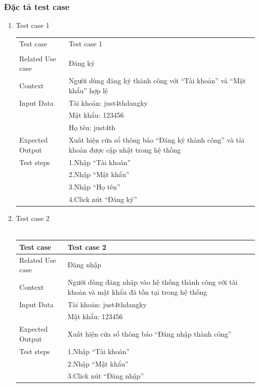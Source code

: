 \documentclass[a4paper, 12pt]{article}
\begin{document}
\subsubsection{Đặc tả test case}
	\begin{enumerate}
		\item Test case 1\\
		\begin{tabular}{|l|l|}
			\hline
			Test case&
			Test case 1\\\\
			\hline
			Related Use case&
			Đăng ký\\
			\hline
			Context&
			Người dùng đăng ký thành công với “Tài khoản” và “Mật khẩu” hợp lệ\\
			\hline
			Input Data&
			Tài khoản: just4thdangky\\&
			Mật khẩu: 123456\\&
			Họ tên: just4th\\
			\hline
			Expected Output&
			Xuất hiện cửa sổ thông báo “Đăng ký thành công” và tài khoản được cập nhật trong hệ thống\\
			\hline
			Test steps&
			1.Nhập “Tài khoản”\\&
			2.Nhập “Mật khẩu”\\&
			3.Nhập “Họ tên”\\&
			4.Click nút “Đăng ký”\\
			\hline
		\end{tabular}
		\item Test case 2\\\\
		\begin{tabular}{|l|l|}
			\hline
			Test case&
			Test case 2\\
			\hline
			Related Use case&
			Đăng nhập\\
			\hline
			Context&
			Người dùng đăng nhập vào hệ thống thành công với tài khoản và mật khẩu đã tồn tại trong hệ thống\\
			\hline
			Input Data&
			Tài khoản: just4thdangky\\&
			Mật khẩu: 123456\\
			\hline
			Expected Output&
			Xuất hiện cửa sổ thông báo “Đăng nhập thành công” \\
			\hline
			Test steps&
			1.Nhập “Tài khoản”\\&
			2.Nhập “Mật khẩu”\\&
			3.Click nút “Đăng nhập”\\
			\hline
		\end{tabular}

\end{enumerate}
\end{document}
